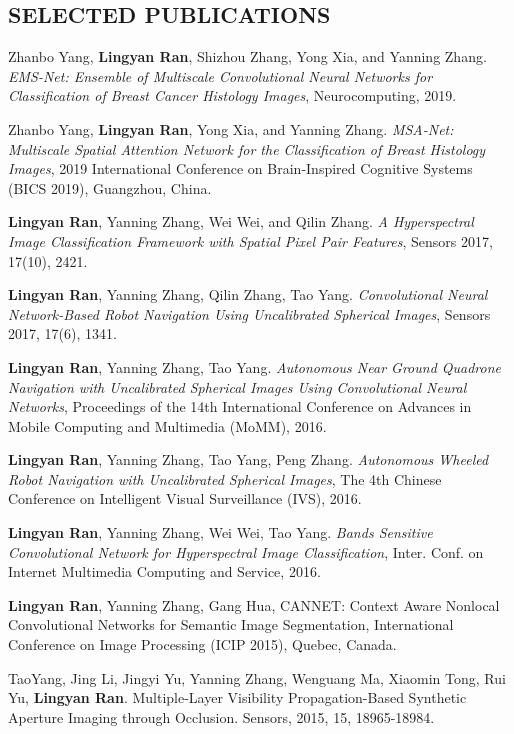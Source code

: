 \documentclass[margin]{res}
\begin{document}
\begin{resume}
\section{SELECTED PUBLICATIONS}

    Zhanbo Yang, \textbf{Lingyan Ran}, Shizhou Zhang, Yong Xia, and Yanning Zhang. \textit{EMS-Net: Ensemble of Multiscale Convolutional Neural Networks for Classification of Breast Cancer Histology Images}, Neurocomputing, 2019.

    Zhanbo Yang, \textbf{Lingyan Ran}, Yong Xia, and Yanning Zhang. \textit{MSA-Net: Multiscale Spatial Attention Network for the Classification of Breast Histology Images}, 2019 International Conference on Brain-Inspired Cognitive Systems (BICS 2019), Guangzhou, China.

	\textbf{Lingyan Ran}, Yanning Zhang, Wei Wei, and Qilin Zhang. \textit{A Hyperspectral Image Classification Framework with Spatial Pixel Pair Features}, Sensors 2017, 17(10), 2421.

	\textbf{Lingyan Ran}, Yanning Zhang, Qilin Zhang, Tao Yang. \textit{Convolutional Neural Network-Based Robot Navigation Using Uncalibrated Spherical Images}, Sensors 2017, 17(6), 1341.

	\textbf{Lingyan Ran}, Yanning Zhang, Tao Yang. \textit{Autonomous Near Ground Quadrone Navigation
 with Uncalibrated Spherical Images Using Convolutional Neural Networks}, Proceedings of the 14th International Conference on Advances in Mobile Computing and Multimedia (MoMM), 2016.

  \textbf{Lingyan Ran}, Yanning Zhang, Tao Yang, Peng Zhang. \textit{Autonomous Wheeled Robot Navigation with Uncalibrated Spherical Images}, The 4th Chinese Conference on Intelligent Visual Surveillance (IVS), 2016.

  \textbf{Lingyan Ran}, Yanning Zhang, Wei Wei, Tao Yang. \textit{Bands Sensitive Convolutional Network for Hyperspectral Image Classification}, Inter. Conf. on Internet Multimedia Computing and Service, 2016.

                \textbf{Lingyan Ran}, Yanning Zhang, Gang Hua, CANNET: Context Aware Nonlocal Convolutional Networks for Semantic Image Segmentation, International Conference on Image Processing (ICIP 2015), Quebec, Canada.

                TaoYang, Jing Li, Jingyi Yu, Yanning Zhang, Wenguang Ma, Xiaomin Tong, Rui Yu, \textbf{Lingyan Ran}. Multiple-Layer Visibility Propagation-Based Synthetic Aperture Imaging through Occlusion. Sensors, 2015, 15, 18965-18984.


\end{resume}
\end{document}
